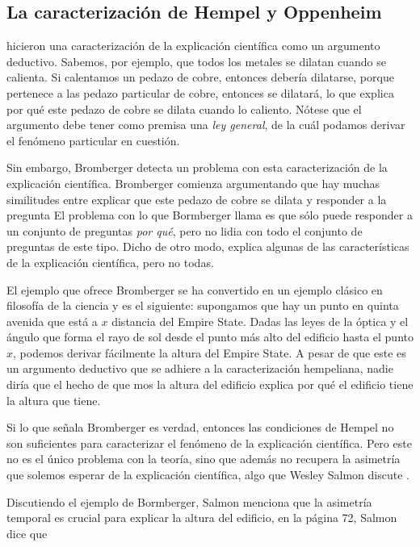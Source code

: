 \subsection{La caracterización de Hempel y Oppenheim}

\parencite{Hempel1948} hicieron una caracterización de la explicación científica como un argumento deductivo. Sabemos, por ejemplo, que todos los metales se dilatan cuando se calienta. Si calentamos un pedazo de cobre, entonces debería dilatarse, porque pertenece a las  pedazo particular de cobre, entonces se dilatará, lo que explica por qué este pedazo de cobre se dilata cuando lo caliento. Nótese que el argumento debe tener como premisa una \emph{ley general}, de la cuál podamos derivar el fenómeno particular en cuestión.

Sin embargo, Bromberger \citeyear{Bromberger1966} detecta un
problema con esta caracterización de la explicación científica.
Bromberger comienza argumentando que hay muchas similitudes entre
explicar que este pedazo de cobre se dilata y responder a la
pregunta  El problema con lo que Bormberger llama  es que sólo puede responder a un conjunto de preguntas
\emph{por qué}, pero no lidia con todo el conjunto de preguntas de
este tipo. Dicho de otro modo, explica algunas de las características
de la explicación científica, pero no todas.

El ejemplo que ofrece Bromberger se ha convertido en un ejemplo clásico en filosofía de la ciencia y es el siguiente: supongamos que hay un punto en quinta avenida que está a $x$ distancia del Empire State. Dadas las leyes de la óptica y el ángulo que forma el rayo de sol desde el punto más alto del edificio hasta el punto $x$, podemos derivar fácilmente la altura del Empire State. A pesar de que este es un argumento deductivo que se adhiere a la caracterización hempeliana, nadie diría que el hecho de que mos la altura del edificio explica por qué el edificio tiene la altura que tiene.

Si lo que señala Bromberger es verdad, entonces las condiciones de
Hempel no son suficientes para caracterizar el fenómeno de la
explicación científica. Pero este no es el único problema con la
teoría, sino que además no recupera la asimetría que solemos esperar
de la explicación científica, algo que Wesley Salmon discute
\citeyear{Salmon1970}.

Discutiendo el ejemplo de Bormberger, Salmon menciona que la
asimetría temporal es crucial para explicar la altura del edificio,
en la página 72, Salmon dice que

